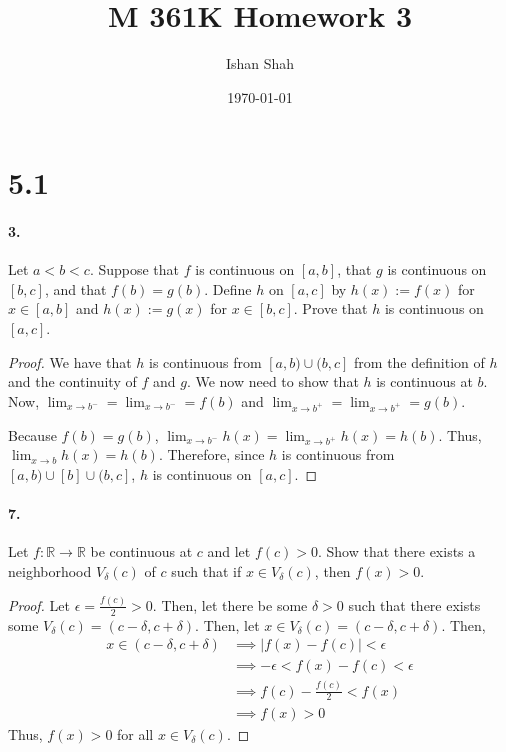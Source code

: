 \documentclass[12pt]{article}
\theoremstyle{remark}
\begin{document}
\title{M 361K Homework 3}
\author{Ishan Shah}
\date{\today}
\maketitle

\section*{5.1}
\paragraph{3.} Let $a<b<c$. Suppose that $f$ is continuous on $[a, b]$, that $g$ is continuous on $[b, c]$, and that $f(b)=g(b)$. Define $h$ on $[a, c]$ by $h(x):=f(x)$ for $x \in[a, b]$ and $h(x):=g(x)$ for $x \in[b, c]$. Prove that $h$ is continuous on $[a, c]$.
\begin{proof}
    We have that $h$ is continuous from $[a, b) \cup (b, c]$ from the definition of $h$ and the continuity of $f$ and $g$. We now need to show that $h$ is continuous at $b$. Now, $\lim_{x \to b^-} = \lim_{x \to b^-} = f(b)$ and $\lim_{x \to b^+} = \lim_{x \to b^+} = g(b)$. 
    
    Because $f(b) = g(b)$, $\lim_{x \to b^-} h(x) = \lim_{x \to b^+} h(x) = h(b)$. Thus, $\lim_{x \to b} h(x) = h(b)$. Therefore, since $h$ is continuous from $[a, b) \cup [b] \cup (b, c]$, $h$ is continuous on $[a, c]$.
\end{proof}

\paragraph{7.} Let $f: \mathbb{R} \rightarrow \mathbb{R}$ be continuous at $c$ and let $f(c)>0$. Show that there exists a neighborhood $V_\delta(c)$ of $c$ such that if $x \in V_\delta(c)$, then $f(x)>0$.
\begin{proof}
    Let $\epsilon = \frac{f(c)}{2} > 0$. Then, let there be some $\delta > 0$ such that there exists some $V_\delta(c) = (c - \delta, c + \delta)$. Then, let $x \in V_\delta(c) = (c - \delta, c + \delta)$. Then,
    \begin{align*}
        x \in (c - \delta, c + \delta) &\implies |f(x) - f(c)| < \epsilon \\
        &\implies -\epsilon < f(x) - f(c) < \epsilon \\
        &\implies f(c) - \frac{f(c)}{2} < f(x) \\
        &\implies f(x) > 0
    \end{align*}
    Thus, $f(x) > 0$ for all $x \in V_\delta(c)$.
\end{proof}
\end{document}
